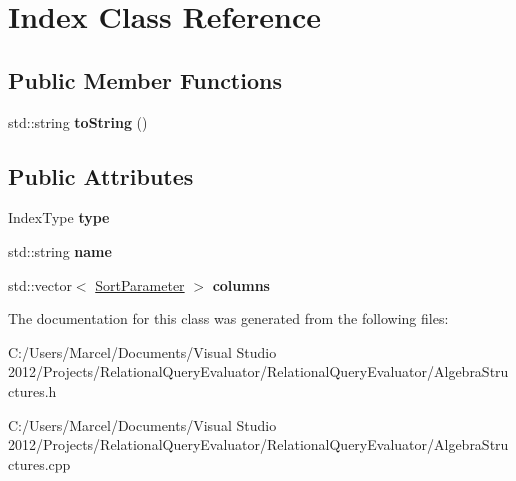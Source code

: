 \hypertarget{class_index}{\section{Index Class Reference}
\label{class_index}
}
\subsection*{Public Member Functions}
\begin{DoxyCompactItemize}
\item 
\hypertarget{class_index_a041acc7f8f4b9a1c081aa4f826f976e0}{std\+::string {\bfseries to\+String} ()}\label{class_index_a041acc7f8f4b9a1c081aa4f826f976e0}

\end{DoxyCompactItemize}
\subsection*{Public Attributes}
\begin{DoxyCompactItemize}
\item 
\hypertarget{class_index_aa1772697ba294e1df853b8be2cc45409}{Index\+Type {\bfseries type}}\label{class_index_aa1772697ba294e1df853b8be2cc45409}

\item 
\hypertarget{class_index_af557cb673e8298bc13d74e369f050084}{std\+::string {\bfseries name}}\label{class_index_af557cb673e8298bc13d74e369f050084}

\item 
\hypertarget{class_index_aacff426f599d6f3d4c244456bcf2d594}{std\+::vector$<$ \hyperlink{class_sort_parameter}{Sort\+Parameter} $>$ {\bfseries columns}}\label{class_index_aacff426f599d6f3d4c244456bcf2d594}

\end{DoxyCompactItemize}


The documentation for this class was generated from the following files\+:\begin{DoxyCompactItemize}
\item 
C\+:/\+Users/\+Marcel/\+Documents/\+Visual Studio 2012/\+Projects/\+Relational\+Query\+Evaluator/\+Relational\+Query\+Evaluator/Algebra\+Structures.\+h\item 
C\+:/\+Users/\+Marcel/\+Documents/\+Visual Studio 2012/\+Projects/\+Relational\+Query\+Evaluator/\+Relational\+Query\+Evaluator/Algebra\+Structures.\+cpp\end{DoxyCompactItemize}
